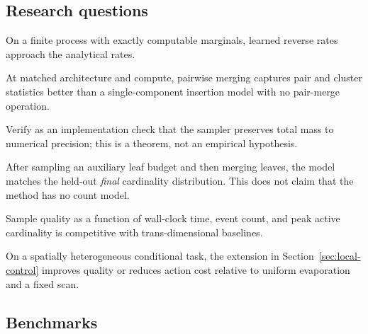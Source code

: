 \documentclass[10pt]{article}
\theoremstyle{definition}
\theoremstyle{remark}
\begin{document}
\subsection{Research questions}

\begin{description}[leftmargin=1.0cm,style=nextline]
  \item[H1: Reverse correctness.] On a finite process with exactly computable marginals, learned reverse rates approach the analytical rates.
  \item[H2: Benefit of coagulation.] At matched architecture and compute,
  pairwise merging captures pair and cluster statistics better than a
  single-component insertion model with no pair-merge operation.
  \item[Check 1: Conservation.] Verify as an implementation check that the
  sampler preserves total mass to numerical precision; this is a theorem,
  not an empirical hypothesis.
  \item[H3: Cardinality.] After sampling an auxiliary leaf budget and then
  merging leaves, the model matches the held-out \emph{final} cardinality
  distribution.  This does not claim that the method has no count model.
  \item[H4: Efficiency.] Sample quality as a function of wall-clock time, event count, and peak active cardinality is competitive with trans-dimensional baselines.
  \item[H5: Local control.] On a spatially heterogeneous conditional task,
  the extension in Section~\ref{sec:local-control} improves quality or
  reduces action cost relative to uniform evaporation and a fixed scan.
\end{description}

\subsection{Benchmarks}
\end{document}
